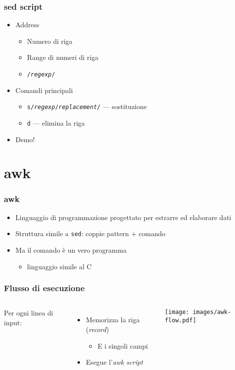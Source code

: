 \documentclass[xetex,table]{beamer}
\begin{document}
\begin{frame}
  \frametitle{sed script}
  \begin{itemize}
  \item Address
    \begin{itemize}
    \item Numero di riga
    \item Range di numeri di riga
    \item \texttt{/{\em regexp}/}
    \end{itemize}
  \item Comandi principali
    \begin{itemize}
    \item \texttt{s/\emph{regexp}/\emph{replacement}/} --- sostituzione
    \item \texttt{d} --- elimina la riga
    \end{itemize}
  \item Demo!
  \end{itemize}
\end{frame}

\section{awk}

\begin{frame}
  \frametitle{awk}
  \begin{itemize}
  \item Linguaggio di programmazione progettato per estrarre ed
    elaborare dati
  \item Struttura simile a \texttt{sed}: coppie pattern + comando
  \item Ma il comando è un vero programma
    \begin{itemize}
    \item linguaggio simile al C
    \end{itemize}
  \end{itemize}
\end{frame}

\begin{frame}
  \frametitle{Flusso di esecuzione}
  \begin{columns}
    Per ogni linea di input:
    \begin{itemize}
    \item Memorizza la riga ({\em record})
      \begin{itemize}
      \item E i singoli campi
      \end{itemize}
    \item Esegue l'{\em awk script}
    \end{itemize}
    \begin{center}
      \texttt{[image: images/awk-flow.pdf]}
    \end{center}
  \end{columns}
\end{frame}
\end{document}
